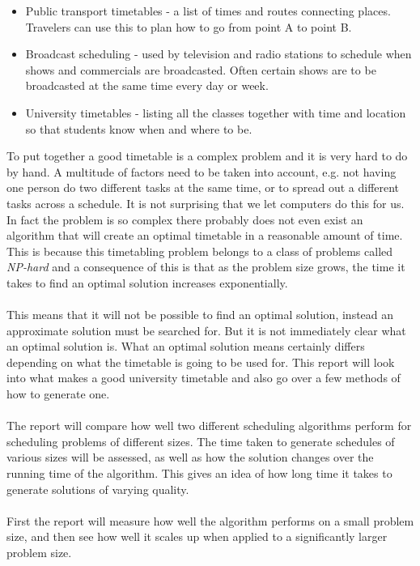 \documentclass[titlepage,a4paper]{article}
\begin{document}
\begin{itemize}

  \item Public transport timetables - a list of times and routes connecting places. Travelers can use this to plan how to go from point A to point B.
  \item Broadcast scheduling - used by television and radio stations to schedule when shows and commercials are broadcasted. Often certain shows are to be broadcasted at the same time every day or week.
  \item University timetables - listing all the classes together with time and location so that students know when and where to be. 

\end{itemize}
To put together a good timetable is a complex problem and it is very hard to do by hand. A multitude of factors need to be taken into account, e.g. not having one person do two different tasks at the same time, or to spread out a different tasks across a schedule. It is not surprising that we let computers do this for us. In fact the problem is so complex there probably does not even exist an algorithm that will create an optimal timetable in a reasonable amount of time. This is because this timetabling problem belongs to a class of problems called \emph{NP-hard}\cite{guidedSearch09}  and a consequence of this is that as the problem size grows, the time it takes to find an optimal solution increases exponentially. \\\\
This means that it will not be possible to find an optimal solution, instead an approximate solution must be searched for. But it is not immediately clear what an optimal solution is. What an optimal solution means certainly differs depending on what the timetable is going to be used for. This report will look into what makes a good university timetable and also go over a few methods of how to generate one. \\\\
The report will compare how well two different scheduling algorithms perform for scheduling problems of different sizes. The time taken to generate schedules of various sizes will be assessed, as well as how the solution changes over the running time of the algorithm. This gives an idea of how long time it takes to generate solutions of varying quality. \\\\
First the report will measure how well the algorithm performs on a small problem size, and then see how well it scales up when applied to a significantly larger problem size.
\end{document}
